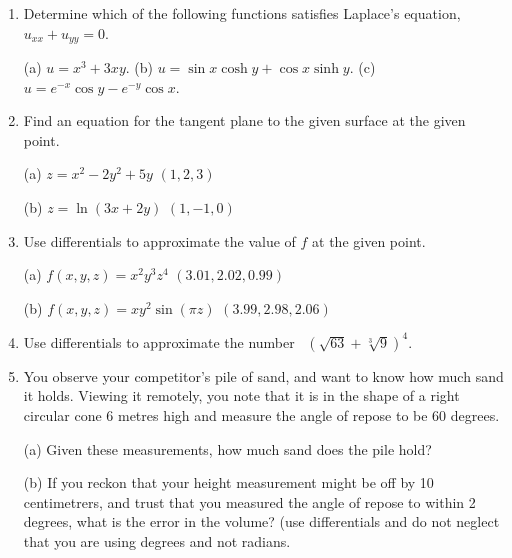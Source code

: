 \documentclass[12pt]{article}
\begin{document}
\begin{enumerate}
  
\item  Determine which of the following functions satisfies Laplace's equation, $u_{xx}+u_{yy}=0$.

  (a) $u=x^3+3xy$. \qquad
  (b) $u=\sin x \cosh y + \cos x \sinh y$. \qquad
  (c) $u=e^{-x} \cos y - e^{-y} \cos x$.


\item Find an equation for the tangent plane to the given surface at the given point.

  (a) $z=x^2 - 2y^2 + 5y$ \quad $(1,2,3)$  \qquad

  (b) $z=\ln(3x+2y)$ \quad $(1,-1,0)$



\item   Use differentials to approximate the value of $f$ at the given point.

  (a) $f(x,y,z)= x^2 y^3 z^4$ \quad $(3.01, 2.02, 0.99 )$ \qquad

  (b)  $f(x,y,z)= x y^2 \sin(\pi z)$ \quad $(3.99, 2.98, 2.06 )$ 



\item   Use differentials to approximate the number  \
     $(\sqrt{63} + \sqrt[3]{9})^4$.



\item   You observe your competitor's pile of sand, and want to know how much sand it holds.  Viewing it remotely, you note that it is in
  the shape of a right circular cone 6 metres high and measure the angle of repose to be 60 degrees. 

(a) Given these measurements, how much sand does the pile hold?

(b) If you reckon that your height measurement might be off by 10 centimetrers, and trust that you measured the angle of repose to within 2
  degrees, what is the error in the volume?  (use differentials and do not neglect that you are using degrees and not radians.


  
\end{enumerate}
\end{document}
